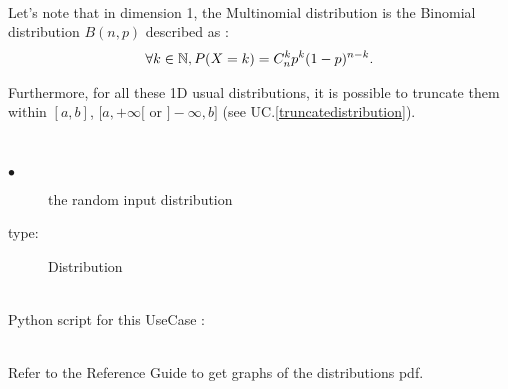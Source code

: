 \textspace\\
Let's note that in dimension 1, the Multinomial distribution is the Binomial distribution $B(n,p)$ described as :
\begin{align*}
  \forall k \in  {\mathbb N}, P(X=k) = C^k_n p^k (1-p)^{n-k}.
\end{align*}

Furthermore, for all these 1D usual distributions, it is possible to truncate them within $[a,b]$, $[a, +\infty[$ or $]-\infty, b]$ (see UC.\ref{truncatedistribution}).

\textspace\\
\noindent%
{
  \begin{description}
  \item[$\bullet$] the random input distribution
  \item[type:] Distribution
  \end{description}
}

\textspace\\
Python  script for this UseCase :


\textspace\\

Refer to the Reference Guide to get graphs of the distributions pdf.
